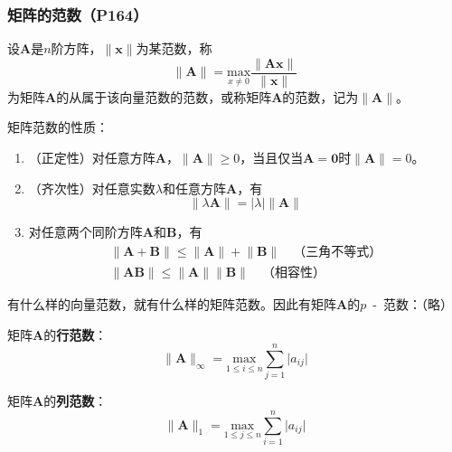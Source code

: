 \documentclass[fontset=ubuntu]{ctexart}
\numberwithin{equation}{section}
\numberwithin{theorem}{section}
\begin{document}
\begin{multicols}{2}
    \subsubsection{矩阵的范数（P164）}

    设$\mathbf{A}$是$n$阶方阵，$\lVert\mathbf{x}\rVert$为某范数，称
    \begin{equation*}
        \lVert\mathbf{A}\rVert=\underset{x\neq 0}{\text{max}}\frac{\lVert\mathbf{Ax}\rVert}{\lVert\mathbf{x}\rVert}
    \end{equation*}
    为矩阵$\mathbf{A}$的从属于该向量范数的范数，或称矩阵$\mathbf{A}$的范数，记为$\lVert\mathbf{A}\rVert$。

    矩阵范数的性质：
    \begin{enumerate}[label=(\arabic*)]
        \item （正定性）对任意方阵$\mathbf{A}$，$\lVert\mathbf{A}\rVert\geq 0$，当且仅当$\mathbf{A}=\mathbf{0}$时$\lVert\mathbf{A}\rVert=0$。
        \item （齐次性）对任意实数$\lambda$和任意方阵$\mathbf{A}$，有
            \begin{equation*}
                \lVert\lambda\mathbf{A}\rVert=\lvert\lambda\rvert\lVert\mathbf{A}\rVert
            \end{equation*}
        \item 对任意两个同阶方阵$\mathbf{A}$和$\mathbf{B}$，有
            \begin{gather*}
                \lVert\mathbf{A}+\mathbf{B}\rVert \leq \lVert\mathbf{A}\rVert + \lVert\mathbf{B}\rVert\quad \text{（三角不等式）}\\
                \lVert\mathbf{AB}\rVert \leq \lVert\mathbf{A}\rVert \lVert\mathbf{B}\rVert\quad \text{（相容性）}
            \end{gather*}
    \end{enumerate}

    有什么样的向量范数，就有什么样的矩阵范数。因此有矩阵$\mathbf{A}$的$p$\ -\ 范数：（略）

    矩阵$\mathbf{A}$的\textbf{行范数}：
    \begin{equation}
        \lVert\mathbf{A}\rVert_\infty=\underset{1\leq i\leq n}{\text{max}}\sum_{j=1}^{n}\lvert a_{ij}\rvert
    \end{equation}

    矩阵$\mathbf{A}$的\textbf{列范数}：
    \begin{equation}
        \lVert\mathbf{A}\rVert_1=\underset{1\leq j\leq n}{\text{max}}\sum_{i=1}^{n}\lvert a_{ij}\rvert
    \end{equation}


\end{multicols}
\end{document}
